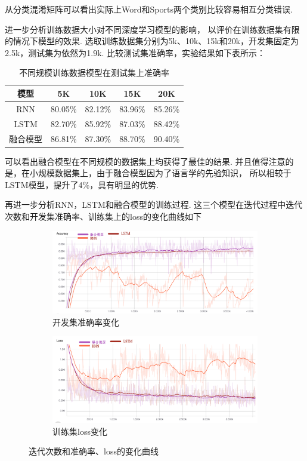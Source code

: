 \documentclass[bachelor,winfonts]{jnuthesis}
\begin{document}
从分类混淆矩阵可以看出实际上Word和Sports两个类别比较容易相互分类错误.

进一步分析训练数据大小对不同深度学习模型的影响，
以评价在训练数据集有限的情况下模型的效果.
选取训练数据集分别为5k、10k、15k和20k，开发集固定为2.5k，测试集为依然为1.9k.
比较测试集准确率，实验结果如下表所示：

\begin{table}[h!]
  \centering
  \begin{tabular}{ccccc}
    \toprule
    \textbf{模型} & \textbf{5K} & \textbf{10K} & \textbf{15K} & \textbf{20K}\\
    \midrule
    RNN & 80.05\% & 82.12\% & 83.96\% & 85.26\%\\
    LSTM & 82.70\% & 85.92\% & 87.03\% & 88.42\%\\
    融合模型 & 86.81\% & 87.30\% & 88.70\% & 90.40\%\\
    \bottomrule
  \end{tabular}
  \caption{不同规模训练数据模型在测试集上准确率}
\end{table}

可以看出融合模型在不同规模的数据集上均获得了最佳的结果.
并且值得注意的是，在小规模数据集上，由于融合模型因为了语言学的先验知识，
所以相较于LSTM模型，提升了4\%，具有明显的优势.

再进一步分析RNN，LSTM和融合模型的训练过程.
这三个模型在迭代过程中迭代次数和开发集准确率、训练集上的loss的变化曲线如下

\begin{figure}[h!]
  \centering
  \begin{subfigure}[b]{0.8\linewidth}
    \includegraphics[width=\linewidth]{accuracy-1.png}
    \caption{开发集准确率变化}
  \end{subfigure}
  \begin{subfigure}[b]{0.8\linewidth}
    \includegraphics[width=\linewidth]{loss-1.png}
    \caption{训练集loss变化}
  \end{subfigure}
  \caption{迭代次数和准确率、loss的变化曲线}
\end{figure}
\end{document}
